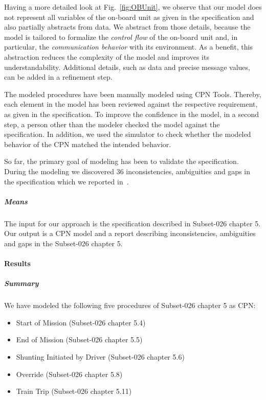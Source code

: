 Having a more detailed look at Fig.~\ref{fig:OBUnit}, we observe that our model does not represent all variables of the on-board unit as given in the specification and also partially abstracts from data. We abstract from those details, because the model is tailored to formalize the \textit{control flow} of the on-board unit and, in particular, the \textit{communication behavior} with its environment. As a benefit, this abstraction reduces the complexity of the model and improves its understandability. Additional details, such as data and precise message values, can be added in a refinement step.

The modeled procedures have been manually modeled using CPN Tools. Thereby, each element in the model has been reviewed against the respective requirement, as given in the specification. To improve the confidence in the model, in a second step, a person other than the modeler checked the model against the specification. In addition, we used the simulator to check whether the modeled behavior of the CPN matched the intended behavior.

So far, the primary goal of modeling has been to validate the specification. During the modeling we discovered 36 inconsistencies, ambiguities and gaps in the specification which we reported in~\cite{specfindings}. 


\subparagraph{Means}

The input for our approach is the specification described in Subset-026 chapter 5. Our output is a CPN model and a report describing inconsistencies, ambiguities and gaps in the Subset-026 chapter 5.


\paragraph{Results}

\subparagraph{Summary}

We have modeled the following five procedures of Subset-026 chapter 5 as CPN:
\begin{itemize}
	\item Start of Mission (Subset-026 chapter 5.4)
	\item End of Mission (Subset-026 chapter 5.5)
	\item Shunting Initiated by Driver (Subset-026 chapter 5.6)
	\item Override (Subset-026 chapter 5.8)
	\item Train Trip (Subset-026 chapter 5.11)
\end{itemize}

